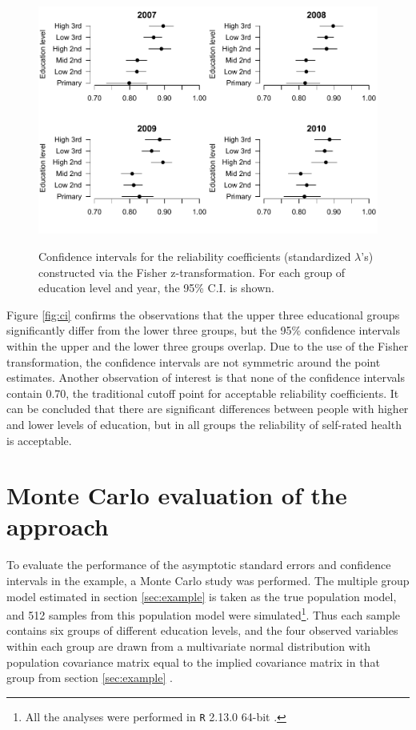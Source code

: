 \documentclass[a4paper,11pt]{article}
\renewcommand{\l}{\lambda}
\newcommand{\0}{\boldsymbol{0}}
\newcommand{\R}{\texttt{R} 2.13.0 64-bit \citep{R}\;}
\begin{document}
\begin{figure}[bth]
\begin{center}
\caption{Confidence intervals for the reliability coefficients (standardized $\l$'s) constructed via the Fisher z-transformation. For each group of  education level and year, the 95\% C.I. is shown.}\label{fig:ci}
\includegraphics[width=.99\textwidth]{CI}
\label{default}
\end{center}
\end{figure}

Figure \ref{fig:ci} confirms the observations that the upper three educational groups significantly differ from the lower three groups, but
the 95\% confidence intervals within the upper and the lower three groups overlap. Due to the use of the Fisher transformation, the
confidence intervals are not symmetric around the point estimates. Another observation of interest is that none of the confidence
intervals contain 0.70, the traditional cutoff point for acceptable reliability coefficients. It can be concluded that there
are significant differences between people with higher and lower levels of education, but in all groups the reliability of self-rated health
is acceptable.

\section{Monte Carlo evaluation of the approach\label{sec:montecarlo}}

To evaluate the performance of the asymptotic standard errors and confidence intervals in the example, 
a Monte Carlo study was performed.  The multiple group model estimated in section \ref{sec:example} is taken as the true 
population model, and 512 samples from this population model were simulated\footnote{All the analyses were
performed in \R.}. Thus each sample contains six groups of different education levels, and the four observed
variables within each group are drawn from a multivariate  normal distribution with population covariance
matrix equal to the implied covariance matrix in that group from section \ref{sec:example} . 
\end{document}
